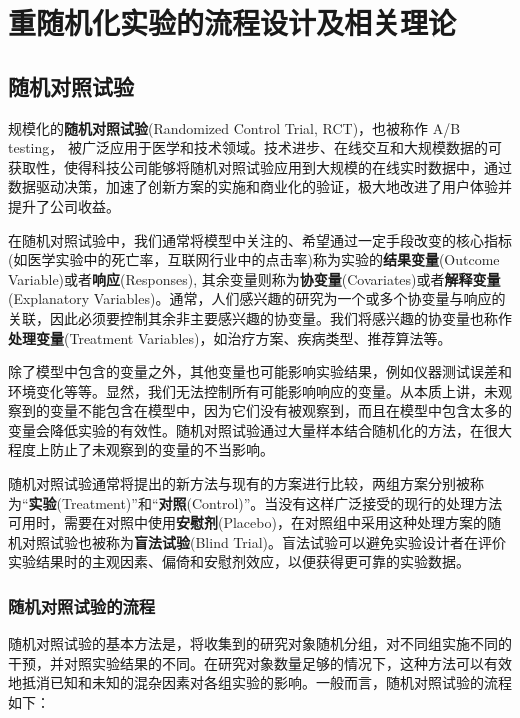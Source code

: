 


\chapter{重随机化实验的流程设计及相关理论}\label{chap2}

\section{随机对照试验}

规模化的\textbf{随机对照试验}(Randomized Control Trial, RCT)，也被称作 A/B testing， 被广泛应用于医学和技术领域。技术进步、在线交互和大规模数据的可获取性，使得科技公司能够将随机对照试验应用到大规模的在线实时数据中，通过数据驱动决策，加速了创新方案的实施和商业化的验证，极大地改进了用户体验并提升了公司收益\cite{kohavi2020online}。

在随机对照试验中，我们通常将模型中关注的、希望通过一定手段改变的核心指标(如医学实验中的死亡率，互联网行业中的点击率)称为实验的\textbf{结果变量}(Outcome Variable)或者\textbf{响应}(Responses), 其余变量则称为\textbf{协变量}(Covariates)或者\textbf{解释变量}(Explanatory Variables)。通常，人们感兴趣的研究为一个或多个协变量与响应的关联，因此必须要控制其余非主要感兴趣的协变量。我们将感兴趣的协变量也称作\textbf{处理变量}(Treatment Variables)，如治疗方案、疾病类型、推荐算法等。

除了模型中包含的变量之外，其他变量也可能影响实验结果，例如仪器测试误差和环境变化等等。显然，我们无法控制所有可能影响响应的变量。从本质上讲，未观察到的变量不能包含在模型中，因为它们没有被观察到，而且在模型中包含太多的变量会降低实验的有效性。随机对照试验通过大量样本结合随机化的方法，在很大程度上防止了未观察到的变量的不当影响。

随机对照试验通常将提出的新方法与现有的方案进行比较，两组方案分别被称为“\textbf{实验}(Treatment)”和“\textbf{对照}(Control)”。当没有这样广泛接受的现行的处理方法可用时，需要在对照中使用\textbf{安慰剂}(Placebo)，在对照组中采用这种处理方案的随机对照试验也被称为\textbf{盲法试验}(Blind Trial)。盲法试验可以避免实验设计者在评价实验结果时的主观因素、偏倚和安慰剂效应，以便获得更可靠的实验数据\cite{moher2010consort}。

\subsection{随机对照试验的流程}

随机对照试验的基本方法是，将收集到的研究对象随机分组，对不同组实施不同的干预，并对照实验结果的不同。在研究对象数量足够的情况下，这种方法可以有效地抵消已知和未知的混杂因素对各组实验的影响\cite{beller2002randomisation}。一般而言，随机对照试验的流程如下：

